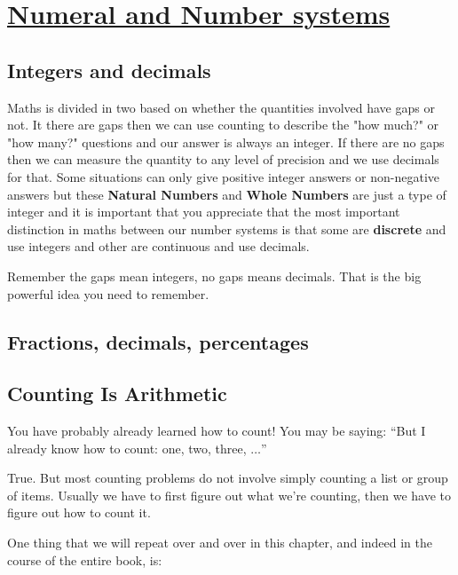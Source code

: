 
\label{chap:numbersystems}




\chapter{\protect\hyperlink{chap:\thechapter}{Numeral and Number systems}}
\LARGE

\section{Integers and decimals}
Maths is divided in two based on whether the quantities involved have gaps or not. It there are gaps then we can use counting to  describe the  "how much?" or "how many?" questions and our answer is always an integer.  If there are no gaps then we can measure the quantity to any level of precision and we use decimals for that.  Some situations can only give positive integer answers or non-negative answers but these \textbf{Natural Numbers} and \textbf{Whole Numbers} are just a type of integer and it is important that you appreciate that the most important distinction in maths between our number systems is that some are \textbf{discrete} and use integers and other are continuous and use  decimals. 

Remember the gaps mean integers, no gaps means decimals. That is the big powerful idea you need to remember.
\section{Fractions, decimals, percentages  }












\section{Counting Is Arithmetic}
You have probably already learned  how to count! You may be saying: “But I already know how to count: one, two, three, $\ldots$”

True. But most counting problems do not involve simply counting a list or group of items. Usually we have to first figure out what we’re counting, then we have to figure out how to count it.

One thing that we will repeat over and over in this chapter, and indeed in the course of the entire book, is:


